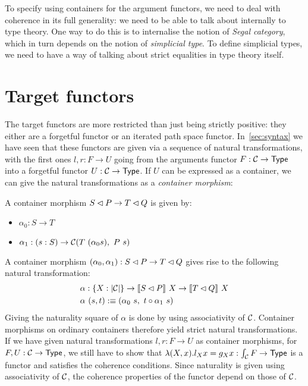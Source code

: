 \documentclass[a4paper,10pt]{report}
\begin{document}
To specify \hits using containers for the argument functors, we need
to deal with coherence in its full generality: we need to be able to
talk about \omegacats internally to type theory. One way to do this is
to internalise the notion of \emph{Segal category}, which in turn
depends on the notion of \emph{simplicial type}. To define simplicial
types, we need to have a way of talking about strict equalities in
type theory itself.

\section{Target functors}

The target functors are more restricted than just being strictly
positive: they either are a forgetful functor or an iterated path
space functor. In~\cref{sec:syntax} we have seen that these functors
are given via a sequence of natural transformations, with the first
ones $l, r : F \to U$ going from the arguments functor
$F : \mathcal{C} \to \mathsf{Type}$ into a forgetful functor $U : \mathcal{C} \to \mathsf{Type}$. If $U$
can be expressed as a container, we can give the natural
transformations as a \emph{container morphism}:

\begin{defn}
A container morphism $S \lhd P \to T \lhd Q$ is given by:
% 
\begin{itemize}
\item $\alpha_0 : S \to T$
\item $\alpha_1 : (s : S) \to \mathcal{C}(T\ (\alpha_0 s) ,\ P\ s)$
\end{itemize}
% 
\end{defn}

A container morphism
$(\alpha_0,\alpha_1) : S \lhd P \to T \lhd Q$ gives rise to the
following natural transformation:
%
\begin{align*}
  &\alpha : \{ X : | \mathcal{C} | \} \to \llbracket S \lhd P \rrbracket \ X \to \llbracket T \lhd Q \rrbracket \ X \\
  &\alpha\ (s , t) :\equiv ( \alpha_0\ s ,\ t \circ \alpha_1\ s )
\end{align*}
%
Giving the naturality square of $\alpha$ is done by using
associativity of $\mathcal{C}$. Container morphisms on ordinary containers
therefore yield strict natural transformations. If we have given
natural transformations $l, r : F \to U$ as container morphisms, for
$F, U : \mathcal{C} \to \mathsf{Type}$, we still have to show that
$\lambda (X , x) . l_X x = g_X x : \int_{\mathcal{C}} F \to \mathsf{Type}$ is a functor
and satisfies the coherence conditions. Since naturality is given
using associativity of $\mathcal{C}$, the coherence properties of the functor
depend on those of $\mathcal{C}$.
\end{document}
